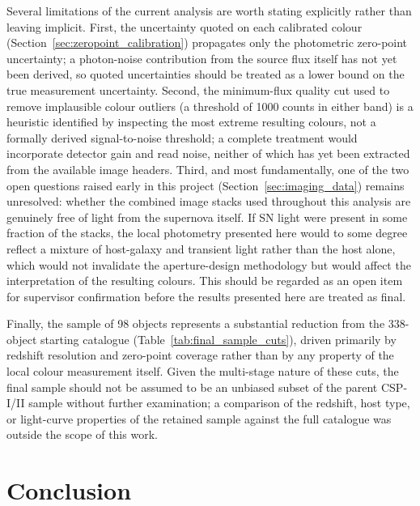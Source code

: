 \documentclass[12pt]{article}
\begin{document}
Several limitations of the current analysis are worth stating explicitly rather than leaving implicit. First, the uncertainty quoted on each calibrated colour (Section~\ref{sec:zeropoint_calibration}) propagates only the photometric zero-point uncertainty; a photon-noise contribution from the source flux itself has not yet been derived, so quoted uncertainties should be treated as a lower bound on the true measurement uncertainty. Second, the minimum-flux quality cut used to remove implausible colour outliers (a threshold of 1000 counts in either band) is a heuristic identified by inspecting the most extreme resulting colours, not a formally derived signal-to-noise threshold; a complete treatment would incorporate detector gain and read noise, neither of which has yet been extracted from the available image headers. Third, and most fundamentally, one of the two open questions raised early in this project (Section~\ref{sec:imaging_data}) remains unresolved: whether the combined image stacks used throughout this analysis are genuinely free of light from the supernova itself. If SN light were present in some fraction of the stacks, the local photometry presented here would to some degree reflect a mixture of host-galaxy and transient light rather than the host alone, which would not invalidate the aperture-design methodology but would affect the interpretation of the resulting colours. This should be regarded as an open item for supervisor confirmation before the results presented here are treated as final.

Finally, the sample of 98 objects represents a substantial reduction from the 338-object starting catalogue (Table~\ref{tab:final_sample_cuts}), driven primarily by redshift resolution and zero-point coverage rather than by any property of the local colour measurement itself. Given the multi-stage nature of these cuts, the final sample should not be assumed to be an unbiased subset of the parent CSP-I/II sample without further examination; a comparison of the redshift, host type, or light-curve properties of the retained sample against the full catalogue was outside the scope of this work.

\section{Conclusion}
\label{sec:conclusion}
\end{document}
